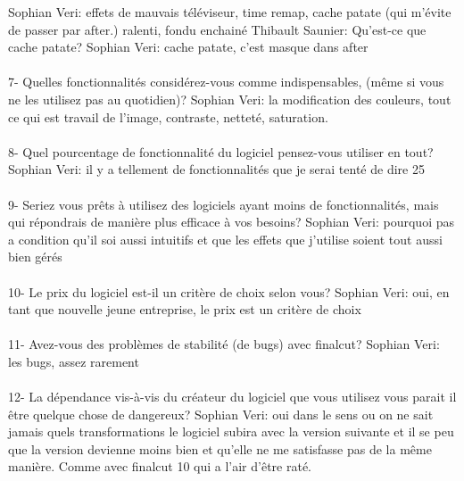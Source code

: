 Sophian Veri: effets de mauvais téléviseur, time remap, cache patate (qui m'évite
de passer par after.) ralenti, fondu enchainé
Thibault Saunier: Qu'est-ce que cache patate?
Sophian Veri: cache patate, c'est masque dans after

\paragraph{}
7-  Quelles fonctionnalités considérez-vous comme indispensables, (même si vous
ne les utilisez pas au quotidien)?
Sophian Veri: la modification des couleurs,  tout ce qui est travail de
l'image, contraste, netteté, saturation.

\paragraph{}
8- Quel pourcentage de fonctionnalité du logiciel pensez-vous utiliser
en tout?
Sophian Veri: il y a  tellement de fonctionnalités que je serai tenté
de dire 25%

\paragraph{}
9- Seriez vous prêts à utilisez des logiciels ayant moins de fonctionnalités,
mais qui répondrais de manière plus efficace à vos besoins?
Sophian Veri: pourquoi pas a condition qu'il soi aussi intuitifs et que les effets
que j'utilise soient tout aussi bien gérés

\paragraph{}
10-  Le prix du logiciel est-il un critère de choix selon vous?
Sophian Veri: oui, en tant que nouvelle jeune entreprise, le prix est
un critère de choix

\paragraph{}
11- Avez-vous des problèmes de stabilité (de bugs) avec finalcut?
Sophian Veri: les bugs, assez rarement

\paragraph{}
12- La dépendance vis-à-vis du créateur du logiciel que vous utilisez
vous parait il être quelque chose de dangereux?
Sophian Veri: oui dans le sens ou on ne sait jamais quels transformations le
logiciel subira avec la version suivante et il se peu que la version devienne
moins bien et qu'elle ne me satisfasse pas de la même manière. Comme avec
finalcut 10 qui a l'air d'être raté.

